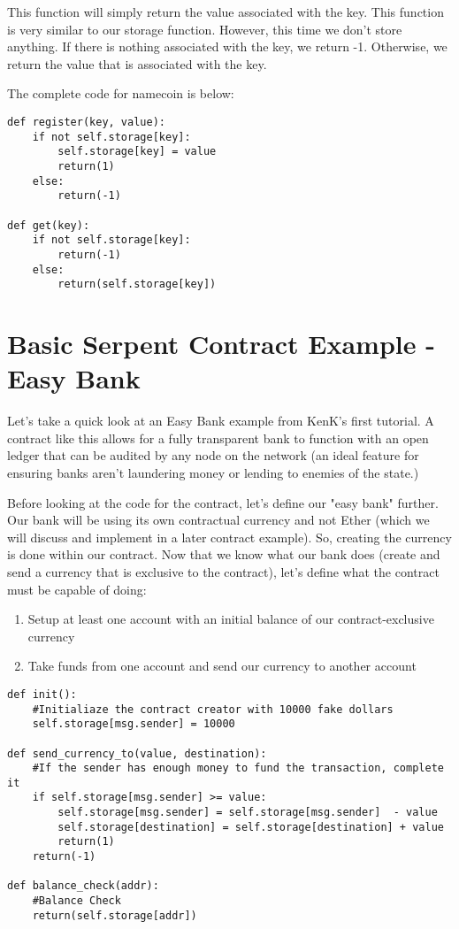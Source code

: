 \documentclass[12pt]{article}
\begin{document}
This function will simply return the value associated with the key. This function is very similar to our storage function. However, this time we don't store anything. If there is nothing associated with the key, we return -1. Otherwise, we return the value that is associated with the key.

The complete code for namecoin is below:

\begin{mdframed}
\begin{verbatim}
def register(key, value):
	if not self.storage[key]:
		self.storage[key] = value
		return(1)
	else:
		return(-1)

def get(key):
	if not self.storage[key]:
		return(-1)
	else:
		return(self.storage[key])
\end{verbatim}
\end{mdframed}

\section{Basic Serpent Contract Example - Easy Bank}
Let's take a quick look at an Easy Bank example from KenK's first tutorial. A contract like this allows for a fully transparent bank to function with an open ledger that can be audited by any node on the network (an ideal feature for ensuring banks aren't laundering money or lending to enemies of the state.)

Before looking at the code for the contract, let's define our "easy bank" further. Our bank will be using its own contractual currency and not Ether (which we will discuss and implement in a later contract example). So, creating the currency is done within our contract. Now that we know what our bank does (create and send a currency that is exclusive to the contract), let's define what the contract must be capable of doing:
\begin{enumerate}
\item Setup at least one account with an initial balance of our contract-exclusive currency
\item Take funds from one account and send our currency to another account
\end{enumerate}


\begin{mdframed}
\begin{verbatim}
def init():
	#Initialiaze the contract creator with 10000 fake dollars
	self.storage[msg.sender] = 10000

def send_currency_to(value, destination):
	#If the sender has enough money to fund the transaction, complete it
	if self.storage[msg.sender] >= value:
		self.storage[msg.sender] = self.storage[msg.sender]  - value
		self.storage[destination] = self.storage[destination] + value
		return(1)
	return(-1)

def balance_check(addr):
	#Balance Check
	return(self.storage[addr])
\end{verbatim}
\end{mdframed}
		
\end{document}
